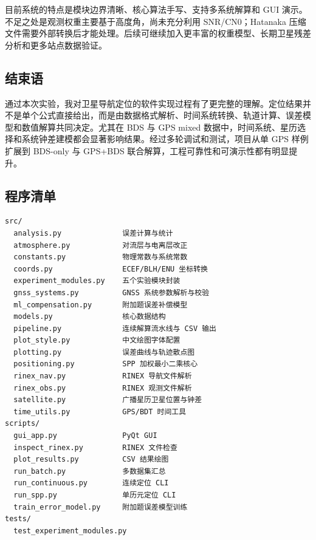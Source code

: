 目前系统的特点是模块边界清晰、核心算法手写、支持多系统解算和 GUI 演示。不足之处是观测权重主要基于高度角，尚未充分利用 SNR/CN0；Hatanaka 压缩文件需要外部转换后才能处理。后续可继续加入更丰富的权重模型、长期卫星残差分析和更多站点数据验证。

\subsection{结束语}

通过本次实验，我对卫星导航定位的软件实现过程有了更完整的理解。定位结果并不是单个公式直接给出，而是由数据格式解析、时间系统转换、轨道计算、误差模型和数值解算共同决定。尤其在 BDS 与 GPS mixed 数据中，时间系统、星历选择和系统钟差建模都会显著影响结果。经过多轮调试和测试，项目从单 GPS 样例扩展到 BDS-only 与 GPS+BDS 联合解算，工程可靠性和可演示性都有明显提升。

\subsection{程序清单}

\begin{verbatim}
src/
  analysis.py              误差计算与统计
  atmosphere.py            对流层与电离层改正
  constants.py             物理常数与系统常数
  coords.py                ECEF/BLH/ENU 坐标转换
  experiment_modules.py    五个实验模块封装
  gnss_systems.py          GNSS 系统参数解析与校验
  ml_compensation.py       附加题误差补偿模型
  models.py                核心数据结构
  pipeline.py              连续解算流水线与 CSV 输出
  plot_style.py            中文绘图字体配置
  plotting.py              误差曲线与轨迹散点图
  positioning.py           SPP 加权最小二乘核心
  rinex_nav.py             RINEX 导航文件解析
  rinex_obs.py             RINEX 观测文件解析
  satellite.py             广播星历卫星位置与钟差
  time_utils.py            GPS/BDT 时间工具
scripts/
  gui_app.py               PyQt GUI
  inspect_rinex.py         RINEX 文件检查
  plot_results.py          CSV 结果绘图
  run_batch.py             多数据集汇总
  run_continuous.py        连续定位 CLI
  run_spp.py               单历元定位 CLI
  train_error_model.py     附加题误差模型训练
tests/
  test_experiment_modules.py
\end{verbatim}
